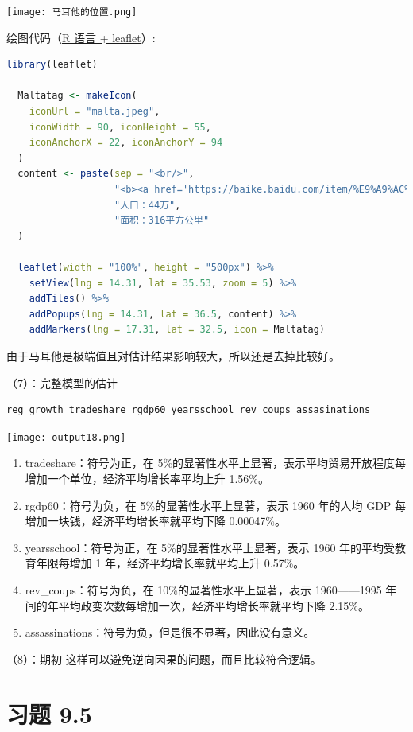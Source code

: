 \documentclass[cn,fancy,blue,11pt]{elegantbook}
\begin{document}
\noindent\texttt{[image: 马耳他的位置.png]}

绘图代码（\href{https://rstudio.github.io/leaflet/}{R 语言 + leaflet}）:

\begin{lstlisting}[language=R]
  library(leaflet)

  Maltatag <- makeIcon(
    iconUrl = "malta.jpeg",
    iconWidth = 90, iconHeight = 55,
    iconAnchorX = 22, iconAnchorY = 94
  )
  content <- paste(sep = "<br/>",
                   "<b><a href='https://baike.baidu.com/item/%E9%A9%AC%E8%80%B3%E4%BB%96'>马耳他</a></b>",
                   "人口：44万",
                   "面积：316平方公里"
  )

  leaflet(width = "100%", height = "500px") %>%
    setView(lng = 14.31, lat = 35.53, zoom = 5) %>%
    addTiles() %>%
    addPopups(lng = 14.31, lat = 36.5, content) %>%
    addMarkers(lng = 17.31, lat = 32.5, icon = Maltatag)
\end{lstlisting}

由于马耳他是极端值且对估计结果影响较大，所以还是去掉比较好。

（7）：完整模型的估计

\begin{lstlisting}
reg growth tradeshare rgdp60 yearsschool rev_coups assasinations
\end{lstlisting}

\noindent\texttt{[image: output18.png]}

\begin{enumerate}
\item
  tradeshare：符号为正，在 5\%的显著性水平上显著，表示平均贸易开放程度每增加一个单位，经济平均增长率平均上升 1.56\%。
\item
  rgdp60：符号为负，在 5\%的显著性水平上显著，表示 1960 年的人均 GDP 每增加一块钱，经济平均增长率就平均下降 0.00047\%。
\item
  yearsschool：符号为正，在 5\%的显著性水平上显著，表示 1960 年的平均受教育年限每增加 1 年，经济平均增长率就平均上升 0.57\%。
\item
  rev\_coups：符号为负，在 10\%的显著性水平上显著，表示 1960------1995 年间的年平均政变次数每增加一次，经济平均增长率就平均下降 2.15\%。
\item
  assassinations：符号为负，但是很不显著，因此没有意义。
\end{enumerate}

（8）：期初
这样可以避免逆向因果的问题，而且比较符合逻辑。

\hypertarget{section-49}{%
\section{习题 9.5}\label{section-49}}
\end{document}
